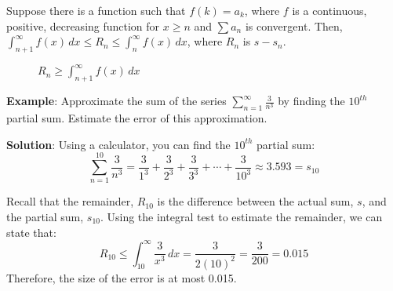 Suppose there is a function such that $f(k) = a_k$, where $f$ is a continuous, 
positive, decreasing function for $x \geq n$ and $\sum a_n$ is convergent. 
Then, $\int_{n+1}^\infty f(x)\,dx \leq R_n \leq \int_n^\infty f(x)\,dx$, where 
$R_n$ is $s - s_n$. 

\begin{figure}[htbp]
    \centering
    \caption{$R_n \geq \int_{n+1}^\infty f(x)\,dx$ }
    \label{fig:remainderfloor}
\end{figure}

\textbf{Example}: Approximate the sum of the series $\sum_{n=1}^\infty 
\frac{3}{n^3}$ by finding the $10^{th}$ partial sum. Estimate the error of 
this approximation. 

\textbf{Solution}: Using a calculator, you can find the $10^{th}$ partial sum: 
$$\sum_{n=1}^{10} \frac{3}{n^3} = \frac{3}{1^3} + \frac{3}{2^3} + 
\frac{3}{3^3} + \cdots + \frac{3}{10^3} \approx 3.593 = s_{10}$$

Recall that the remainder, $R_{10}$ is the difference between the actual sum, 
$s$, and the partial sum, $s_{10}$. Using the integral test to estimate the 
remainder, we can state that: $$R_{10} \leq \int_{10}^\infty \frac{3}{x^3}\,dx 
= \frac{3}{2(10)^2} = \frac{3}{200} = 0.015$$ Therefore, the size of the error 
is at most 0.015. 

